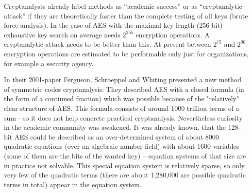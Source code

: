 Cryptanalysts already label methods as ``academic success'' or as ``cryptanalytic attack'' if they are theoretically faster than the complete testing of all keys (brute force analysis). In the case of AES with the maximal key length (256 bit) exhaustive key search on average needs $2^{255}$ encryption operations. A cryptanalytic attack needs to be better than this. At present between $2^{75}$ and $2^{90}$ encryption operations are estimated to be performable only just for organizations, for example a security agency.

In their 2001-paper Ferguson, Schroeppel and Whiting \cite{Ferguson2001}
presented a new method of symmetric codes cryptanalysis: They described AES with
a closed formula (in the form of a continued fraction) which was possible
because of the "relatively" clear structure of AES. This formula consists of
around 1000 trillion terms of a sum - so it does not help concrete practical
cryptanalysis. Nevertheless curiosity in the academic community was awakened.
It was already known, that the 128-bit AES could be described as an
over-determined system of about 8000 quadratic equations (over an algebraic
number field) with about 1600 variables (some of them are the bits of the wanted
key) -- equation systems of that size are in practice not solvable. This special
equation system is relatively sparse, so only very few of the quadratic terms
(there are about 1,280,000 are possible quadratic terms in total) appear in the
equation system.

